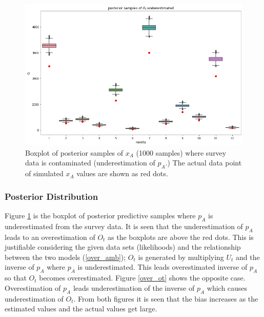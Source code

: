 \documentclass[
10pt, %
a4paper, %
oneside, %
headinclude,footinclude, %
BCOR5mm, %
]{scrartcl}
\begin{document}
\begin{figure}[htb]
	\centering
	\includegraphics[width=1\linewidth]{Figures/early_contamination_under-ot.png}
	\caption{Boxplot of posterior samples of $x_A$ (1000 samples) where survey data is contaminated (underestimation of $p_A$.)  The actual data point of simulated $x_A$ values are shown as red dots.}
	\label{under_ot}
\end{figure}

\subsubsection{Posterior Distribution}

\normalsize 
Figure \ref{under_ot} is the boxplot of posterior predictive samples where $p_A$ is underestimated from the survey data. It is seen that the underestimation of $p_A$ leads to an overestimation of $O_t$ as the boxplots are above the red dots. This is justifiable considering the given data sets (likelihoods) and the relationship between the two models (\ref{over_amb}); $O_t$ is generated by multiplying $U_t$ and the inverse of $p_A$ where $p_A$ is underestimated. This leads overestimated inverse of $p_A$ so that  $O_t$ becomes overestimated. Figure \ref{over_ot} shows the opposite case. Overestimation of $p_A$ leads underestimation of the inverse of $p_A$ which causes underestimation of $O_t$. From both figures it is seen that the bias increases as the estimated values and the actual values get large.\\
\end{document}
